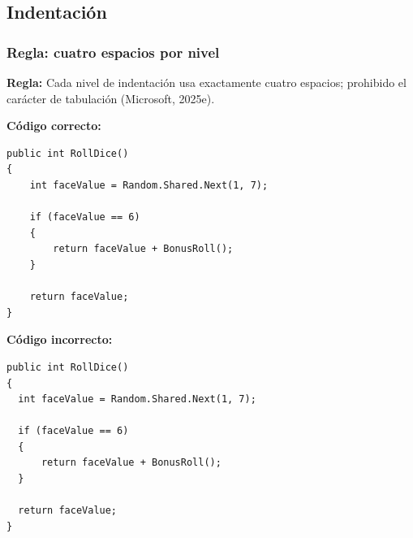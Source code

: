 \subsection{Indentación}

\subsubsection{Regla: cuatro espacios por nivel}

\textbf{Regla:} Cada nivel de indentación usa exactamente cuatro espacios; prohibido el carácter de tabulación (Microsoft, 2025e).

\textbf{Código correcto:}
\begin{lstlisting}[style=csharpstyle]
public int RollDice()
{
    int faceValue = Random.Shared.Next(1, 7);

    if (faceValue == 6)
    {
        return faceValue + BonusRoll();
    }

    return faceValue;
}
\end{lstlisting}

\textbf{Código incorrecto:}
\begin{lstlisting}[style=csharpstyle]
public int RollDice()
{
  int faceValue = Random.Shared.Next(1, 7);

  if (faceValue == 6)
  {
      return faceValue + BonusRoll();
  }

  return faceValue;
}
\end{lstlisting}
